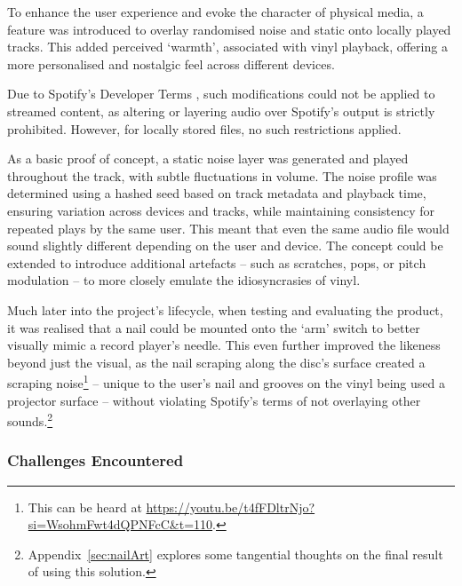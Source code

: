             To enhance the user experience and evoke the character of physical media, a feature was introduced to overlay randomised noise and static onto locally played tracks. This added perceived `warmth', associated with vinyl playback, offering a more personalised and nostalgic feel across different devices.
            
            Due to Spotify’s Developer Terms \cite{spotifyDevTerms}, such modifications could not be applied to streamed content, as altering or layering audio over Spotify’s output is strictly prohibited. However, for locally stored files, no such restrictions applied.
            
            As a basic proof of concept, a static noise layer was generated and played throughout the track, with subtle fluctuations in volume. The noise profile was determined using a hashed seed based on track metadata and playback time, ensuring variation across devices and tracks, while maintaining consistency for repeated plays by the same user. This meant that even the same audio file would sound slightly different depending on the user and device. The concept could be extended to introduce additional artefacts -- such as scratches, pops, or pitch modulation -- to more closely emulate the idiosyncrasies of vinyl.
    
            Much later into the project's lifecycle, when testing and evaluating the product, it was realised that a nail could be mounted onto the `arm' switch to better visually mimic a record player's needle. This even further improved the likeness beyond just the visual, as the nail scraping along the disc's surface created a scraping noise\footnote{This can be heard at \url{https://youtu.be/t4fFDltrNjo?si=WsohmFwt4dQPNFcC&t=110}.} -- unique to the user's nail and grooves on the vinyl being used a projector surface -- without violating Spotify's terms of not overlaying other sounds.\footnote{Appendix~\ref{sec:nailArt} explores some tangential thoughts on the final result of using this solution.}
        
            \subsubsection{Challenges Encountered}
    
